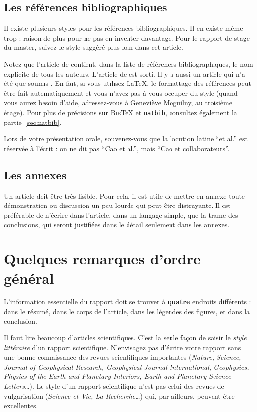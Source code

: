 \documentclass{ipgpmaster}
\begin{document}
\subsection{Les références bibliographiques}

Il existe plusieurs styles pour les références bibliographiques. 
Il en existe même trop : raison de plus pour ne pas en inventer davantage. 
Pour le rapport de stage du master, suivez le style suggéré plus loin 
dans cet article. 

Notez que l'article de \cite{cao1990simultaneous} contient, dans 
la liste de références bi\-blio\-gra\-phiques, le nom explicite de tous 
les auteurs.
L'article de \cite{crase1992nonlinear} est sorti.  
 Il y a aussi un article qui n'a été que 
soumis \citep{mosegaardsoumis}. 
 En fait, si 
vous utilisez \LaTeX, le formattage des références peut être fait
automatiquement et vous n'avez pas à vous occuper du style 
(quand vous aurez besoin d'aide, adressez-vous à Geneviève Moguilny,
au troisième étage). Pour plus de précisions sur 
\textsc{Bib}\TeX{} et \texttt{natbib}, 
 consultez également la partie~\ref{sec:natbib}. 

Lors de votre présentation orale, souvenez-vous que la locution latine 
``et al.'' est réservée à l'écrit : on ne dit pas ``Cao et al.'', 
mais ``Cao et collaborateurs''.


\subsection{Les annexes}

Un article doit être très lisible. Pour cela, il est utile de mettre en 
annexe toute démonstration ou discussion un peu lourde qui peut 
être distrayante. Il est préférable de n'écrire dans l'article, 
dans un langage simple, que la trame des conclusions, qui seront justifiées 
dans le détail seulement dans les annexes.


\section{Quelques remarques d'ordre général}

L'information essentielle du rapport doit se trouver à {\bfseries quatre} endroits
différents : dans le résumé, dans le corps de l'article, dans les 
légendes des figures, et dans la conclusion.

Il faut lire beaucoup d'articles scientifiques. C'est la seule façon 
de saisir le \emph{style littéraire\/} d'un rapport scientifique.
N'envisagez pas d'écrire votre rapport sans une bonne connaissance des 
revues scientifiques importantes (\emph{Nature, Science, Journal of 
Geo\-phy\-si\-cal Research, Geophysical Journal International, Geophysics, 
Physics of the Earth and Planetary Interiors, Earth and Planetary Science 
Letters\dots\/}). Le style d'un rapport scientifique n'est pas celui des 
revues de vulgarisation (\emph{Science et Vie, La Recherche\dots\/})
qui, par ailleurs, peuvent être excellentes.
\end{document}
